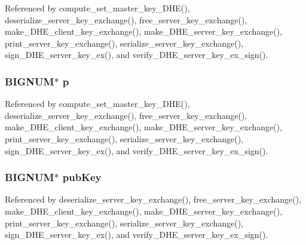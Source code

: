 Referenced by compute\+\_\+set\+\_\+master\+\_\+key\+\_\+\+D\+H\+E(), deserialize\+\_\+server\+\_\+key\+\_\+exchange(), free\+\_\+server\+\_\+key\+\_\+exchange(), make\+\_\+\+D\+H\+E\+\_\+client\+\_\+key\+\_\+exchange(), make\+\_\+\+D\+H\+E\+\_\+server\+\_\+key\+\_\+exchange(), print\+\_\+server\+\_\+key\+\_\+exchange(), serialize\+\_\+server\+\_\+key\+\_\+exchange(), sign\+\_\+\+D\+H\+E\+\_\+server\+\_\+key\+\_\+ex(), and verify\+\_\+\+D\+H\+E\+\_\+server\+\_\+key\+\_\+ex\+\_\+sign().

\subsubsection[{\texorpdfstring{p}{p}}]{\setlength{\rightskip}{0pt plus 5cm}B\+I\+G\+N\+UM$\ast$ p}\hypertarget{structdhe__server__key__exchange__t_a4ed2e531b9fd8a6ca6ad6804565299a7}{}\label{structdhe__server__key__exchange__t_a4ed2e531b9fd8a6ca6ad6804565299a7}


Referenced by compute\+\_\+set\+\_\+master\+\_\+key\+\_\+\+D\+H\+E(), deserialize\+\_\+server\+\_\+key\+\_\+exchange(), free\+\_\+server\+\_\+key\+\_\+exchange(), make\+\_\+\+D\+H\+E\+\_\+client\+\_\+key\+\_\+exchange(), make\+\_\+\+D\+H\+E\+\_\+server\+\_\+key\+\_\+exchange(), print\+\_\+server\+\_\+key\+\_\+exchange(), serialize\+\_\+server\+\_\+key\+\_\+exchange(), sign\+\_\+\+D\+H\+E\+\_\+server\+\_\+key\+\_\+ex(), and verify\+\_\+\+D\+H\+E\+\_\+server\+\_\+key\+\_\+ex\+\_\+sign().

\subsubsection[{\texorpdfstring{pub\+Key}{pubKey}}]{\setlength{\rightskip}{0pt plus 5cm}B\+I\+G\+N\+UM$\ast$ pub\+Key}\hypertarget{structdhe__server__key__exchange__t_a1aca399a862132922f9cabef045d11e3}{}\label{structdhe__server__key__exchange__t_a1aca399a862132922f9cabef045d11e3}


Referenced by deserialize\+\_\+server\+\_\+key\+\_\+exchange(), free\+\_\+server\+\_\+key\+\_\+exchange(), make\+\_\+\+D\+H\+E\+\_\+client\+\_\+key\+\_\+exchange(), make\+\_\+\+D\+H\+E\+\_\+server\+\_\+key\+\_\+exchange(), print\+\_\+server\+\_\+key\+\_\+exchange(), serialize\+\_\+server\+\_\+key\+\_\+exchange(), sign\+\_\+\+D\+H\+E\+\_\+server\+\_\+key\+\_\+ex(), and verify\+\_\+\+D\+H\+E\+\_\+server\+\_\+key\+\_\+ex\+\_\+sign().

